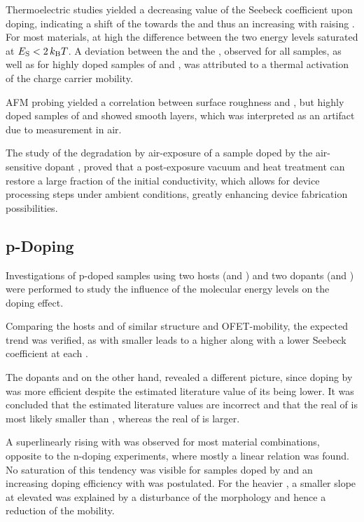 Thermoelectric studies yielded a decreasing value of the Seebeck coefficient upon doping, indicating a shift of the \EfLong towards the \EtLong and thus an increasing \neLong with raising \CLong. For most materials, at high \CLongs the difference between the two energy levels saturated at \mbox{$\Es<2\,\kT$}.
A deviation between the \EactLong and the \Es, observed for all \aob samples, as well as for highly doped samples of \CrPd and \WPd, was attributed to a thermal activation of the charge carrier mobility.

AFM probing yielded a correlation between surface roughness and \CLong, but highly doped samples of \CrPd and \WPd showed smooth layers, which was interpreted as an artifact due to measurement in air.

The study of the degradation by air-exposure of a \CS sample doped by the air-sensitive dopant \WPd, proved that a post-exposure vacuum and heat treatment can restore a large fraction of the initial conductivity, which allows for device processing steps under ambient conditions, greatly enhancing device fabrication possibilities.

\subsection*{p-Doping}
Investigations of p-doped samples using two hosts (\meo and \lili) and two dopants (\FS and \CSF) were performed to study the influence of the molecular energy levels on the doping effect.

Comparing the hosts \meo and \lili of similar structure and OFET-mobility, the expected trend was verified, as \meo with smaller \IE leads to a higher \cLong along with a lower Seebeck coefficient at each \CLong.

The dopants \FS and \CSF on the other hand, revealed a different picture, since doping by \FS was more efficient despite the estimated literature value of its \EA being lower. It was concluded that the estimated literature values are incorrect and that the real \EA of \CSF is most likely smaller than , whereas the real \EA of \FS is larger.

A superlinearly rising \cLong with \CLong was observed for most material combinations, opposite to the n-doping experiments, where mostly a linear relation was found.
No saturation of this tendency was visible for samples doped by \FS and an increasing doping efficiency with \CLong was postulated.
For the heavier \CSF, a smaller \cLong slope at elevated \CLong was explained by a disturbance of the morphology and hence a reduction of the mobility.


